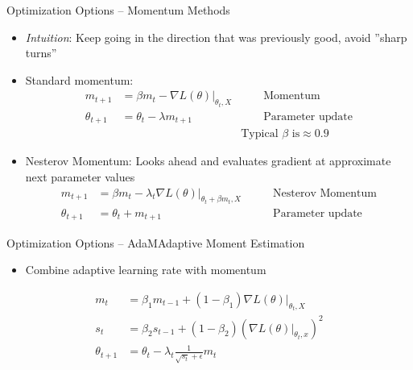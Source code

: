 \documentclass[ignorenonframetext,xcolor=x11names]{beamer}
\begin{document}
\begin{frame}[label=full]{Optimization Options -- Momentum Methods}
\begin{itemize}
  \item \emph{Intuition}: Keep going in the direction that was previously good, avoid ''sharp turns''
  \item Standard momentum:
\begin{align*}
m_{t+1} &= \beta m_{t} - \nabla L(\theta) \rvert_{\theta_t, X} &\qquad \text{Momentum} \\
\theta_{t+1} &= \theta_{t} - \lambda m_{t+1} &\qquad \text{Parameter update} \\
& &\text{Typical $\beta$ is} \approx 0.9
\end{align*}
  \item Nesterov Momentum: Looks ahead and evaluates gradient at approximate next parameter values
\begin{align*}
m_{t+1} &= \beta m_{t} - \lambda_t \nabla L(\theta) \rvert_{\theta_{t}+\beta m_{t}, X} &\qquad \text{Nesterov Momentum} \\
\theta_{t+1} &= \theta_{t} + m_{t+1} &\qquad \text{Parameter update}
\end{align*}
\end{itemize}
\end{frame}


\begin{frame}[label=full]{Optimization Options -- AdaM}{Adaptive Moment Estimation}
\begin{itemize}
  \item Combine adaptive learning rate with momentum
\end{itemize}
\begin{align*}
m_t &= \beta_1 m_{t-1} + (1-\beta_1) \nabla L(\theta)\rvert_{\theta_t, X} \\
s_t &= \beta_2 s_{t-1} + (1-\beta_2) \left( \nabla L(\theta)\vert_{\theta_t, x} \right)^2 \\
\theta_{t+1} &= \theta_t - \lambda_t \frac{1}{\sqrt{s_t}+\epsilon} m_t 
\end{align*}
\end{frame}
\end{document}
